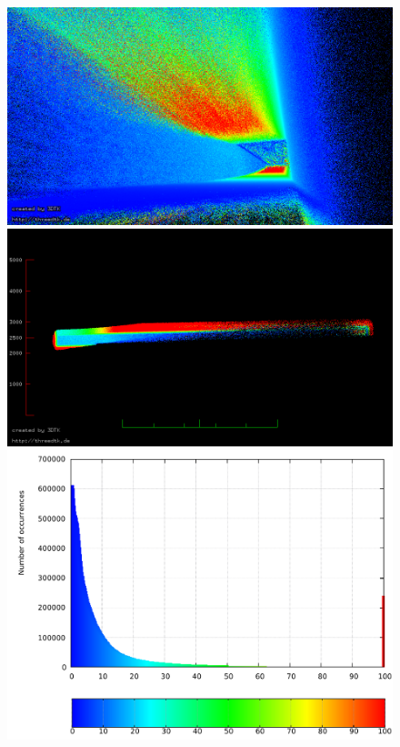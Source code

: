 \begin{figure}
 	\centering
 	\begin{minipage}[c]{0.49\textwidth}
 		\centering
		\includegraphics[width=\textwidth]{./images/uncorr_bottom_pose}\\
		\includegraphics[width=\textwidth]{./images/uncorr_side_view}\\
  		\includegraphics[width=\textwidth]{./images/uncorr_hist}

\end{minipage}
\end{figure}
